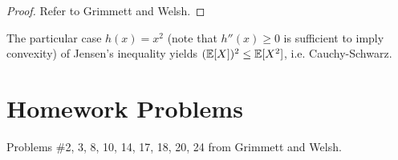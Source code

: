 \begin{proof}
  Refer to Grimmett and Welsh.
\end{proof}

\begin{example}
  The particular case $h(x) = x^2$ (note that $h''(x) \ge 0$ is sufficient to imply convexity) of Jensen's
  inequality yields $(\mathbb{E}[X])^2 \le \mathbb{E}[X^2]$, i.e.
  Cauchy-Schwarz.
\end{example}

\section{Homework Problems}
Problems \#2, 3, 8, 10, 14, 17, 18, 20, 24
from Grimmett and Welsh.
